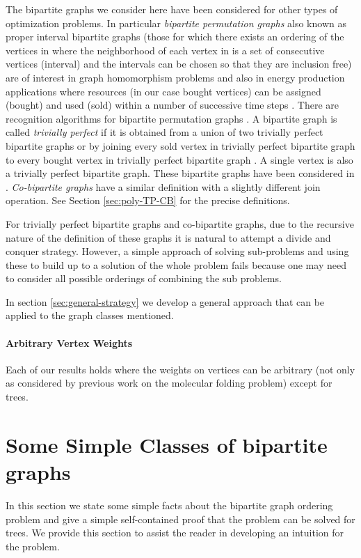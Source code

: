 \documentclass[letterpaper,11pt,abstracton]{scrartcl}
\begin{document}
The bipartite graphs we consider here have been considered for other types of optimization problems.
In particular \emph{bipartite permutation graphs} also known as proper interval bipartite graphs
(those for which there exists an ordering of the vertices in  where the neighborhood of each vertex in  is a set of consecutive vertices (interval) and the intervals can be chosen
so that they are inclusion free) are of interest in graph homomorphism problems \cite{GHRY08} and also
in energy production applications where resources (in our case bought vertices) can be assigned (bought) and used (sold) within a number of
successive time steps \cite{KKRS13,MS12}.
There are recognition algorithms for bipartite permutation graphs \cite{GHRY08,SBS98}.
A bipartite graph is called \emph{trivially perfect} if it is obtained from a union of two trivially perfect bipartite graphs  or by joining every sold vertex in trivially perfect bipartite graph
 to every bought vertex in trivially perfect bipartite graph . A single vertex is also a trivially perfect bipartite graph.
These bipartite graphs have been considered in \cite{CEM13,EKLT12,MMS04}.  \emph{Co-bipartite graphs} have a similar definition
with a slightly different join operation. See Section \ref{sec:poly-TP-CB} for the precise definitions.

For trivially perfect bipartite graphs and co-bipartite graphs, due to the recursive nature
of the definition of these graphs it is natural to attempt a divide and conquer strategy.
However, a simple approach of solving sub-problems and using these to build up to a solution of the whole
problem fails because one may need to consider all possible orderings of combining the sub problems.

In section \ref{sec:general-strategy} we develop a general approach that can be applied to the graph classes
mentioned.





\paragraph{Arbitrary Vertex Weights}
Each of our results holds where the weights on vertices can be
arbitrary (not only  as considered by previous work on the
molecular folding problem) except for trees. 

\section{Some Simple Classes of bipartite graphs}\label{sec:simple}
In this section we state some simple facts about the bipartite graph ordering
problem and give a simple self-contained proof that the problem can be
solved for trees.  We provide this section to assist the reader in
developing an intuition for the problem.
\end{document}
